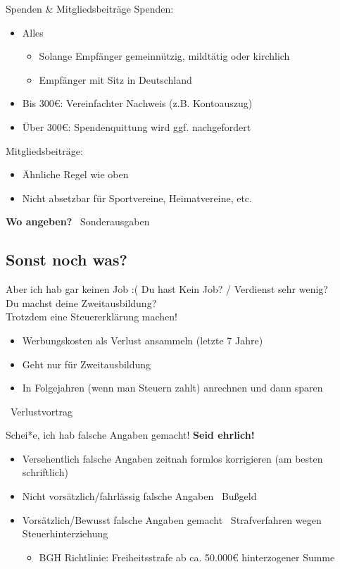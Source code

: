 \documentclass{beamer}
\begin{document}
			\begin{frame}{Spenden \& Mitgliedsbeiträge}
				Spenden:
				\begin{itemize}
					\item Alles
					\begin{itemize}
						\item Solange Empfänger gemeinnützig, mildtätig oder kirchlich
						\item Empfänger mit Sitz in Deutschland
					\end{itemize}
					\item Bis 300€: Vereinfachter Nachweis (z.B. Kontoauszug)
					\item Über 300€: Spendenquittung wird ggf. nachgefordert
				\end{itemize}\n\pause
				Mitgliedsbeiträge:
				\begin{itemize}
					\item Ähnliche Regel wie oben
					\item Nicht absetzbar für Sportvereine, Heimatvereine, etc.
				\end{itemize}\n\pause
				\textbf{Wo angeben?} \textrightarrow\ Sonderausgaben
			\end{frame}
			
		\subsection{Sonst noch was?}
		
			\begin{frame}{Aber ich hab gar keinen Job :(}
				Du hast Kein Job? / Verdienst sehr wenig?\\\pause
				Du machst deine Zweitausbildung?\\\pause
				Trotzdem eine Steuererklärung machen!\n\pause
				\begin{itemize}
					\item Werbungskosten als Verlust ansammeln (letzte 7 Jahre)
					\item Geht nur für Zweitausbildung
					\item In Folgejahren (wenn man Steuern zahlt) anrechnen und dann sparen
				\end{itemize}\n
				\textrightarrow\ Verlustvortrag
			\end{frame}
		
			\begin{frame}{Schei*e, ich hab falsche Angaben gemacht!}
				\textbf{Seid ehrlich!}\n
				\begin{itemize}
					\item Versehentlich falsche Angaben zeitnah formlos korrigieren (am besten schriftlich)
					\item Nicht vorsätzlich/fahrlässig falsche Angaben \textrightarrow\ Bußgeld
					\item Vorsätzlich/Bewusst falsche Angaben gemacht \textrightarrow\ Strafverfahren wegen Steuerhinterziehung
					\begin{itemize}
						\item BGH Richtlinie: Freiheitsstrafe ab ca. 50.000€ hinterzogener Summe
					\end{itemize}
				\end{itemize}
			\end{frame}
		
\end{document}
